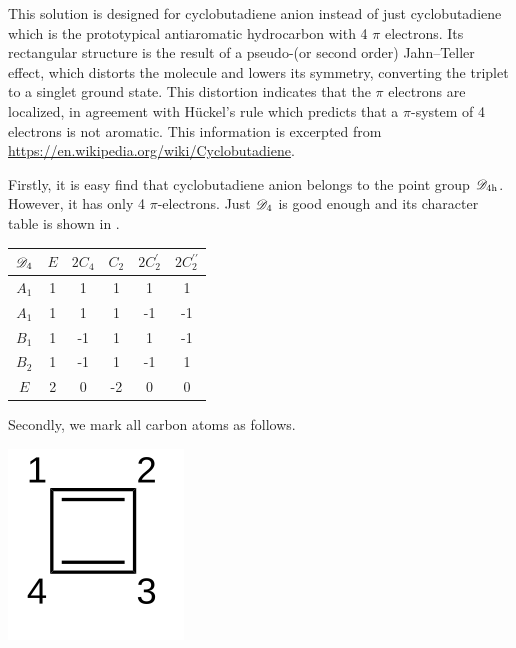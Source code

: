 This solution is designed for cyclobutadiene anion instead of just cyclobutadiene which is the prototypical antiaromatic hydrocarbon with 4 $\pi$ electrons. Its rectangular structure is the result of a pseudo-(or second order) Jahn–Teller effect, which distorts the molecule and lowers its symmetry, converting the triplet to a singlet ground state. This distortion indicates that the $\pi$ electrons are localized, in agreement with H{\"u}ckel's rule which predicts that a $\pi$-system of 4 electrons is not aromatic. This information is excerpted from \url{https://en.wikipedia.org/wiki/Cyclobutadiene}.
		
		Firstly, it is easy find that cyclobutadiene anion belongs to the point group $\mathscr{D}_{\rm 4h}$. However, it has only 4 $\pi$-electrons. Just $\mathscr{D}_{\rm 4}$ is good enough and its character table is shown in .
		\begin{center}
		\setlength{\abovecaptionskip}{0em}
		\label{tab:chatab_3}
		\begin{tabular}{cccccc}\hline
	$\mathscr{D}_{\rm 4}$ & $E$ & $2C_4$ &	$C_2$	& $2C^\prime_2$ & $2C^{\prime\prime}_2$ \\ \hline
			$A_1$	&	1	&	1	&	1	&	1	&	1	\\
			$A_1$	&	1	&	1	&	1	&	-1	&	-1	\\
			$B_1$	&	1	&	-1	&	1	&	1	&	-1	\\
			$B_2$	&	1	&	-1	&	1	&	-1	&	1	\\
			$E$ 	&	2	&	0	&	-2	&	0	&	0\\ \hline
		\end{tabular}
		\end{center}
		
		Secondly, we mark all carbon atoms as follows.
		\begin{center}
		\setlength{\abovecaptionskip}{-0.5em}
		\includegraphics[scale=1.0]{./structures/exercise_1/cyclobutadiene_anion/0.png}
		\label{fig:case3}
		\end{center}
		
